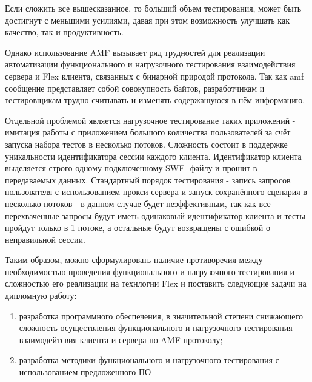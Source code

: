 Если  сложить все вышесказанное, то больший объем тестирования, может быть 
достигнут с меньшими усилиями, давая при этом возможность улучшать как качество, 
так и продуктивность. 

Однако использование AMF вызывает ряд трудностей для реализации автоматизации функционального 
и нагрузочного тестирования взаимодействия сервера и Flex клиента, связанных с бинарной 
природой протокола. Так как amf сообщение представляет собой совокупность байтов, 
разработчикам и тестировщикам трудно считывать и изменять содержащуюся в нём информацию.

Отдельной проблемой является нагрузочное тестирование таких приложений - имитация работы с 
приложением большого количества пользователей за счёт запуска набора тестов в несколько потоков. 
Сложность состоит в поддержке уникальности идентификатора сессии каждого клиента. Идентификатор 
клиента выделяется строго одному подключенному SWF- файлу и прошит в передаваемых данных. 
Стандартный порядок тестирования - запись запросов пользователя с использованием прокси-сервера 
и запуск сохранённого сценария в несколько потоков - в данном случае будет неэффективным, так 
как  все перехваченные запросы будут иметь одинаковый идентификатор клиента и тесты пройдут 
только в 1 потоке, а остальные будут возвращены с ошибкой о неправильной сессии.
 
Таким образом, можно сформулировать наличие противоречия между необходимостью проведения функционального
и нагрузочного тестирования и сложностью его реализации на технлогии Flex и поставить следующие задачи на 
дипломную работу:

\begin{enumerate}
\item разработка программного обеспечения, в значительной степени снижающего сложность осуществления функционального
и нагрузочного тестирования взаимодейтсвия клиента и сервера по AMF-протоколу;
\item разработка методики функционального и нагрузочного тестирования с использованием предложенного ПО
\end{enumerate}